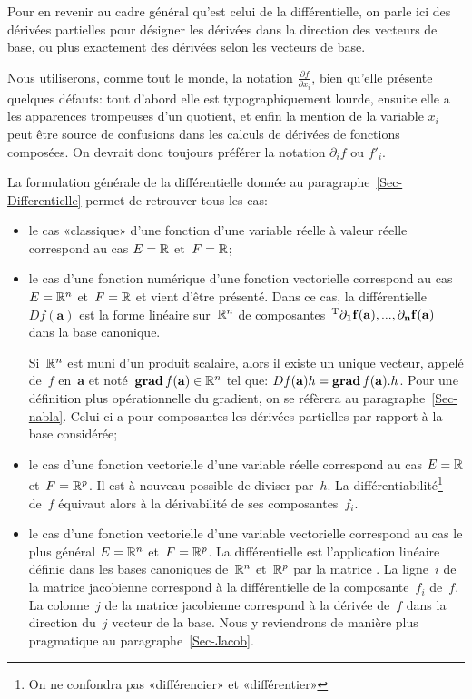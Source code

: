 \begin{remarque}[Remarques]
Pour en revenir au cadre général qu'est celui de la différentielle, on parle ici des dérivées partielles pour désigner les dérivées dans la direction des vecteurs de base, ou plus exactement des dérivées selon les vecteurs de base.

\medskip
Nous utiliserons, comme tout le monde, la notation $\frac{ \partial f}{ \partial x_i}$, bien qu'elle présente quelques défauts: tout d'abord elle est typographiquement lourde, ensuite elle a les apparences trompeuses d'un quotient, et enfin la mention  de la variable $x_i$ peut être source de confusions dans les calculs de dérivées de fonctions composées. On devrait donc toujours préférer la notation $\partial_if$ ou $f'_i$.

\medskip
La formulation générale de la différentielle donnée au paragraphe~\ref{Sec-Differentielle} permet de retrouver tous les cas:
\begin{itemize}
   \item le cas «classique» d'une fonction d'une variable réelle à valeur réelle correspond au cas $E=\mathbb R$ et~$F=\mathbb R$;
   \item le cas d'une fonction numérique d'une fonction vectorielle correspond au cas $E=\mathbb R^n$ et~$F=\mathbb R$ et vient d'être présenté. Dans ce cas, la différentielle~$Df(\mathbf{a})$ est la forme linéaire sur~$\mathbb R^n$ de composantes~${}^\mathrm{T}\mathbf{\partial_1f(\mathbf{a}), ..., \partial_nf(\mathbf{a})}$ dans la base canonique.
   
   Si~$\mathbb R^n$ est muni d'un produit scalaire, alors il existe un unique vecteur, appelé  de~$f$ en~$\mathbf{a}$ et noté~$\operatorname{\mathbf{grad}} f(\mathbf{a})\in\mathbb R^n$ tel que: $Df(\mathbf{a})h=\operatorname{\mathbf{grad}} f(\mathbf{a}).h$. Pour une définition plus opérationnelle du gradient, on se réfèrera au paragraphe~\ref{Sec-nabla}. Celui-ci a pour composantes les dérivées partielles par rapport à la base considérée;
   \item le cas d'une fonction vectorielle d'une variable réelle correspond au cas $E=\mathbb R$ et~$F=\mathbb R^p$. Il est à nouveau possible de diviser par~$h$. La différentiabilité\footnote{On ne confondra pas «différencier» et «différentier»} de~$f$ équivaut alors à la dérivabilité de ses composantes~$f_i$.

   \item le cas d'une fonction vectorielle d'une variable vectorielle correspond au cas le plus général $E=\mathbb R^n$ et~$F=\mathbb R^p$. La différentielle est l'application linéaire définie dans les bases canoniques de~$\mathbb R^n$ et~$\mathbb R^p$ par la matrice . La ligne~$i$ de la matrice jacobienne correspond à la différentielle de la composante~$f_i$ de~$f$. La colonne~$j$ de la matrice jacobienne correspond à la dérivée de~$f$ dans la direction du~$j$ vecteur de la base. Nous y reviendrons de manière plus pragmatique au paragraphe~\ref{Sec-Jacob}.
\end{itemize}
\end{remarque}

